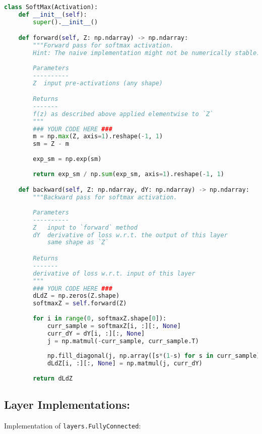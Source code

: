 \begin{lstlisting}[language=Python]
class SoftMax(Activation):
    def __init__(self):
        super().__init__()

    def forward(self, Z: np.ndarray) -> np.ndarray:
        """Forward pass for softmax activation.
        Hint: The naive implementation might not be numerically stable.
        
        Parameters
        ----------
        Z  input pre-activations (any shape)

        Returns
        -------
        f(z) as described above applied elementwise to `Z`
        """
        ### YOUR CODE HERE ###
        m = np.max(Z, axis=1).reshape(-1, 1)
        sm = Z - m
        
        exp_sm = np.exp(sm)
        
        return exp_sm / np.sum(exp_sm, axis=1).reshape(-1, 1)

    def backward(self, Z: np.ndarray, dY: np.ndarray) -> np.ndarray:
        """Backward pass for softmax activation.
        
        Parameters
        ----------
        Z   input to `forward` method
        dY  derivative of loss w.r.t. the output of this layer
            same shape as `Z`

        Returns
        -------
        derivative of loss w.r.t. input of this layer
        """
        ### YOUR CODE HERE ###
        dLdZ = np.zeros(Z.shape)
        softmaxZ = self.forward(Z)
        
        for i in range(0, softmaxZ.shape[0]):
            curr_sample = softmaxZ[i, :][:, None]
            curr_dY = dY[i, :][:, None]
            j = np.matmul(-curr_sample, curr_sample.T)
            
            np.fill_diagonal(j, np.array([s*(1-s) for s in curr_sample]))
            dLdZ[i, :][:, None] = np.matmul(j, curr_dY)
        
        return dLdZ

\end{lstlisting}


\subsection{Layer Implementations:}

Implementation of \texttt{layers.FullyConnected}:

